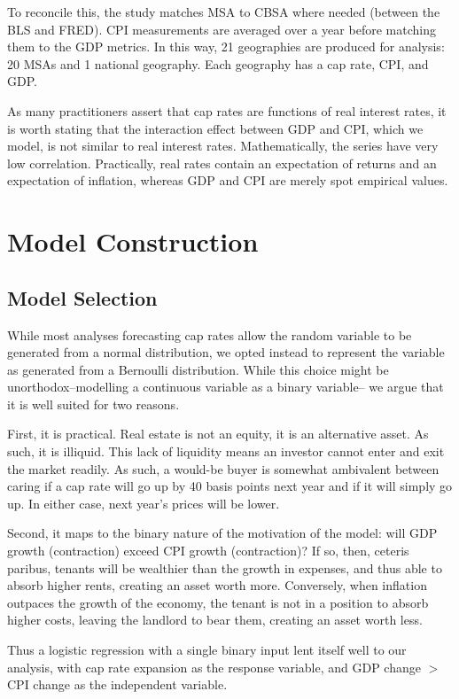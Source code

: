 To reconcile this, the study matches MSA to CBSA where needed (between the BLS and FRED). CPI measurements are averaged over a year before matching them to the GDP metrics. In this way, 21 geographies are produced for analysis: 20 MSAs and 1 national geography. Each geography has a cap rate, CPI, and GDP. 

As many practitioners assert that cap rates are functions of real interest rates, it is worth stating that the interaction effect between GDP and CPI, which we model, is not similar to real interest rates. Mathematically, the series have very low correlation. Practically, real rates contain an expectation of returns and an expectation of inflation, whereas GDP and CPI are merely spot empirical values.
 
\section{Model Construction}

\subsection{Model Selection}
While most analyses forecasting cap rates allow the random variable to be generated from a normal distribution, we opted instead to represent the variable as generated from a Bernoulli distribution. While this choice might be unorthodox--modelling a continuous variable as a binary variable-- we argue that it is well suited for two reasons. 

First, it is practical. Real estate is not an equity, it is an alternative asset. As such, it is illiquid. This lack of liquidity means an investor cannot enter and exit the market readily. As such, a would-be buyer is somewhat ambivalent between caring if a cap rate will go up by 40 basis points next year and if it  will simply go up. In either case, next year's prices will be lower. 

Second, it maps to the binary nature of the motivation of the model: will GDP growth (contraction) exceed CPI growth (contraction)? If so, then, ceteris paribus, tenants will be wealthier than the growth in expenses, and thus able to absorb higher rents, creating an asset worth more. Conversely, when inflation outpaces the growth of the economy, the tenant is not in a position to absorb higher costs, leaving the landlord to bear them, creating an asset worth less. 

Thus a logistic regression with a single binary input lent itself well to our analysis, with cap rate expansion as the response variable, and GDP change $ > $  CPI change as the independent variable. 

